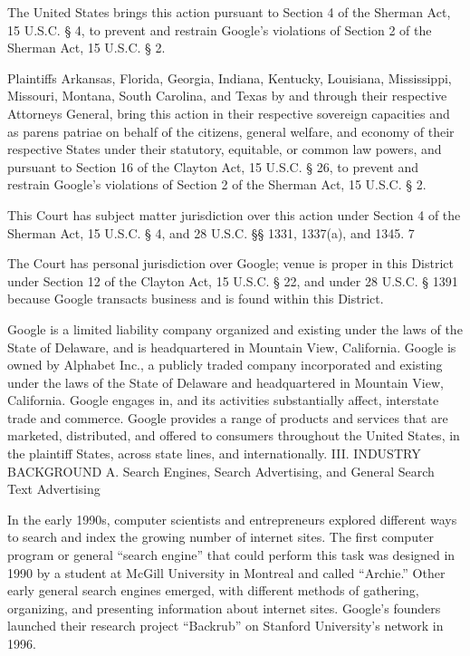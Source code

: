 \documentclass[11pt,b5paper]{scrartcl}
\begin{document}

The United States brings this action pursuant to Section 4 of the Sherman Act,
15 U.S.C. § 4, to prevent and restrain Google’s violations of Section 2 of the Sherman Act,
15 U.S.C. § 2.


Plaintiffs Arkansas, Florida, Georgia, Indiana, Kentucky, Louisiana, Mississippi,
Missouri, Montana, South Carolina, and Texas by and through their respective Attorneys
General, bring this action in their respective sovereign capacities and as parens patriae on behalf
of the citizens, general welfare, and economy of their respective States under their statutory,
equitable, or common law powers, and pursuant to Section 16 of the Clayton Act,
15 U.S.C. § 26, to prevent and restrain Google’s violations of Section 2 of the Sherman Act,
15 U.S.C. § 2.


This Court has subject matter jurisdiction over this action under Section 4 of the
Sherman Act, 15 U.S.C. § 4, and 28 U.S.C. §§ 1331, 1337(a), and 1345.
7


The Court has personal jurisdiction over Google; venue is proper in this District
under Section 12 of the Clayton Act, 15 U.S.C. § 22, and under 28 U.S.C. § 1391 because
Google transacts business and is found within this District.


Google is a limited liability company organized and existing under the laws of the
State of Delaware, and is headquartered in Mountain View, California. Google is owned by
Alphabet Inc., a publicly traded company incorporated and existing under the laws of the State of
Delaware and headquartered in Mountain View, California. Google engages in, and its activities
substantially affect, interstate trade and commerce. Google provides a range of products and
services that are marketed, distributed, and offered to consumers throughout the United States, in
the plaintiff States, across state lines, and internationally.
III.
INDUSTRY BACKGROUND
A.
Search Engines, Search Advertising, and General Search Text Advertising


In the early 1990s, computer scientists and entrepreneurs explored different ways
to search and index the growing number of internet sites. The first computer program or general
“search engine” that could perform this task was designed in 1990 by a student at McGill
University in Montreal and called “Archie.” Other early general search engines emerged, with
different methods of gathering, organizing, and presenting information about internet sites.
Google’s founders launched their research project “Backrub” on Stanford University’s network
in 1996.
\end{document}
